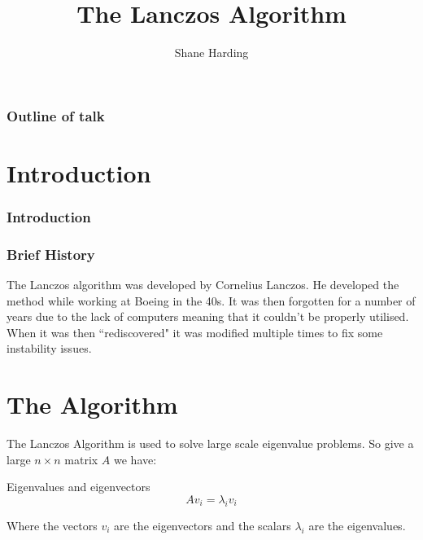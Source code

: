 \documentclass[pdf]{beamer}
\title{The Lanczos Algorithm}
\author{Shane Harding}
\begin{document}
\begin{frame}
\titlepage
\end{frame}


\begin{frame}
\frametitle{Outline of talk}
\tableofcontents[]

\end{frame}

\section{Introduction}

\begin{frame}
\tableofcontents[currentsection]
\end{frame}



\begin{frame}
\frametitle{Introduction}
\centering


\end{frame}

\begin{frame}
\centering
\frametitle{Brief History}
The Lanczos algorithm was developed by Cornelius Lanczos. He developed the method while working at Boeing in the 40s. It was then forgotten for a number of years due to the lack of computers meaning that it couldn't be properly utilised. When it was then ``rediscovered" it was modified multiple times to fix some instability issues.
\end{frame}





\section{The Algorithm}
\begin{frame}
\tableofcontents[currentsection]
\end{frame}



\begin{frame}
The Lanczos Algorithm is used to solve large scale eigenvalue problems. So give a large $n \times n$ matrix $A$ we have:
\begin{exampleblock}{Eigenvalues and eigenvectors}
\[
A v_i = \lambda_i v_i
\]
\end{exampleblock}
Where the vectors $v_i$ are the eigenvectors and the scalars $\lambda_i$ are the eigenvalues.
\end{frame}
\end{document}
